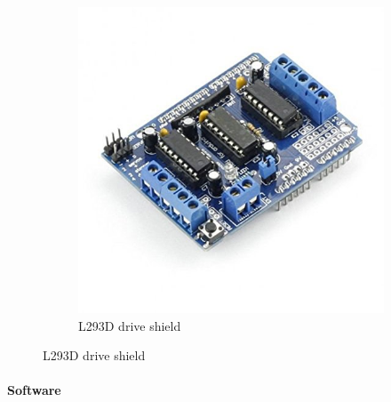 \documentclass[11pt]{article}
\begin{document}
\begin{figure}[h!]
\begin{subfigure}[b]{0.4\textwidth}
		\includegraphics[width=\textwidth]{images/l293d.jpg}
		\caption{L293D drive shield}
	\label{fig:car}
	\end{subfigure}
\end{figure}
\paragraph{Software}
\end{document}
